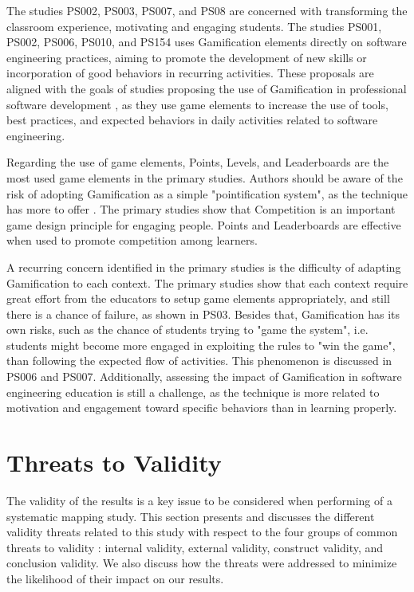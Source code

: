 The studies PS002, PS003, PS007, and PS08 are concerned with transforming the classroom experience, motivating and engaging students. The studies PS001, PS002, PS006, PS010, and PS154 uses Gamification elements directly on software engineering practices, aiming to promote the development of new skills or incorporation of good behaviors in recurring activities. These proposals are aligned with the goals of studies proposing the use of Gamification in professional software development \citep{Pedreira:2015}, as they use game elements to increase the use of tools, best practices, and expected behaviors in daily activities related to software engineering. 

Regarding the use of game elements, Points, Levels, and Leaderboards are the most used game elements in the primary studies. Authors should be aware of the risk of adopting Gamification as a simple "pointification system", as the technique has more to offer \citep{Werbach:2012}. The primary studies show that Competition is an important game design principle for engaging people. Points and Leaderboards are effective when used to promote competition among learners.

A recurring concern identified in the primary studies is the difficulty of adapting Gamification to each context. The primary studies show that each context require great effort from the educators to setup game elements appropriately, and still there is a chance of failure, as shown in PS03. Besides that, Gamification has its own risks, such as the chance of students trying to "game the system", i.e. students might become more engaged in exploiting the rules to "win the game", than following the expected flow of activities. This phenomenon is discussed in PS006 and PS007. Additionally, assessing the impact of Gamification in software engineering education is still a challenge, as the technique is more related to motivation and engagement toward specific behaviors than in learning properly.

\section{Threats to Validity}
\label{sec:smsthreats}

The validity of the results is a key issue to be considered when performing of a systematic mapping study. This section presents and discusses the different validity threats related to this study with respect to the four groups of common threats to validity \citep{Wohlin:2012}: internal validity, external validity, construct validity, and conclusion validity. We also discuss how the threats were addressed to minimize the likelihood of their impact on our results. 

